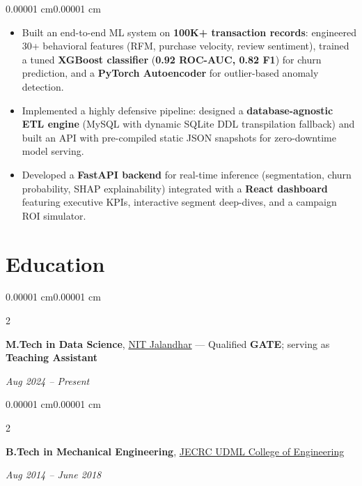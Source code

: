 \documentclass[10pt, letterpaper]{article}
\newenvironment{highlights}{
    \begin{itemize}[
        topsep=0.10 cm,
        parsep=0.10 cm,
        partopsep=0pt,
        itemsep=0pt,
        leftmargin=10pt
    ]
}{
    \end{itemize}
}
\newenvironment{onecolentry}{
    \begin{adjustwidth}{0.00001 cm}{0.00001 cm}
}{
    \end{adjustwidth}
}
\newenvironment{twocolentry}[2][]{
    \onecolentry
    \def\secondColumn{#2}
    \setcolumnwidth{\fill, 4.5 cm}
    \begin{paracol}{2}
}{
    \switchcolumn \raggedleft \secondColumn
    \end{paracol}
    \endonecolentry
}
\begin{document}
\begin{onecolentry}
\begin{highlights}
\item Built an end-to-end ML system on \textbf{100K+ transaction records}: engineered 30+ behavioral features (RFM, purchase velocity, review sentiment), trained a tuned \textbf{XGBoost classifier} (\textbf{0.92 ROC-AUC, 0.82 F1}) for churn prediction, and a \textbf{PyTorch Autoencoder} for outlier-based anomaly detection.
\item Implemented a highly defensive pipeline: designed a \textbf{database-agnostic ETL engine} (MySQL with dynamic SQLite DDL transpilation fallback) and built an API with pre-compiled static JSON snapshots for zero-downtime model serving.
\item Developed a \textbf{FastAPI backend} for real-time inference (segmentation, churn probability, SHAP explainability) integrated with a \textbf{React dashboard} featuring executive KPIs, interactive segment deep-dives, and a campaign ROI simulator.
\end{highlights}
\end{onecolentry}

\section{\textcolor{myblue}{\textbf{Education}}}

\begin{twocolentry}{\textit{Aug 2024 -- Present}}
\textbf{M.Tech in Data Science}, \textcolor{myblue}{\underline{NIT Jalandhar}} — Qualified \textbf{GATE}; serving as \textbf{Teaching Assistant}
\end{twocolentry}

\vspace{0.15cm}

\begin{twocolentry}{\textit{Aug 2014 -- June 2018}}
\textbf{B.Tech in Mechanical Engineering}, \textcolor{myblue}{\underline{JECRC UDML College of Engineering}}
\end{twocolentry}

\end{document}
